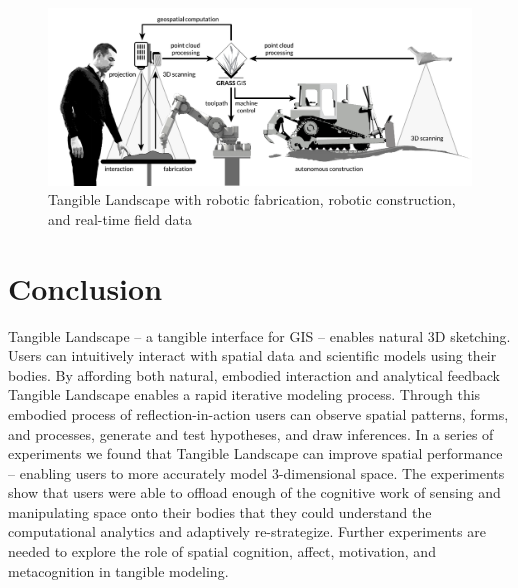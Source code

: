 \documentclass[prodmode,acmtochi]{acmsmall} %
\begin{document}
\begin{figure}
\begin{center}
\includegraphics[width=\textwidth]{images/system_schema_land.pdf}
\caption{Tangible Landscape with robotic fabrication, robotic construction, and real-time field data}
\label{fig:system_schema_land}
\end{center}
\end{figure}

\section{Conclusion}
Tangible Landscape -- a tangible interface for GIS -- 
enables natural 3D sketching. %
%
Users can intuitively interact with 
spatial data and scientific models using their bodies. 
% 
By affording both natural, embodied interaction and analytical feedback
Tangible Landscape enables a
rapid iterative modeling process.
%
Through this embodied process of reflection-in-action 
users can 
observe spatial patterns, forms, and processes, 
generate and test hypotheses, 
and draw inferences. 
%
In a series of experiments we found that 
Tangible Landscape can improve spatial performance -- 
enabling users to more accurately model 3-dimensional space. 
%
The experiments show that users 
were able to offload enough of the cognitive work 
of sensing and manipulating space
onto their bodies
that they could understand the
computational analytics
and adaptively re-strategize.
%
Further experiments are needed
to explore the role of 
spatial cognition, affect, motivation, and metacognition 
in tangible modeling.


\end{document}
